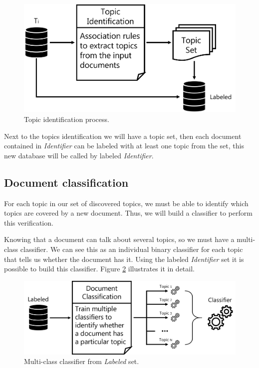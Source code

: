 \begin{figure}[h!]
	\centering
	\includegraphics[width=0.8\linewidth]{01.Chapters/04.Materials/topic-identification}
	\caption{Topic identification process.}
	\label{fig:topic-identification}
\end{figure}

Next to the topics identification we will have a topic set, then each document contained in \textit{Identifier} can be labeled with at least one topic from the set, this new database will be called by labeled \textit{Identifier}.

\subsection{Document classification}

For each topic in our set of discovered topics, we must be able to identify which topics are covered by a new document. Thus, we will build a classifier to perform this verification.

Knowing that a document can talk about several topics, so we must have a multi-class classifier. We can see this as an individual binary classifier for each topic that tells us whether the document has it. Using the labeled \textit{Identifier} set it is possible to build this classifier. Figure \ref{fig:document-classification} illustrates it in detail.

\begin{figure}[h!]
	\centering
	\includegraphics[width=0.9\linewidth]{01.Chapters/04.Materials/document-classification}
	\caption{Multi-class classifier from \textit{Labeled} set.}
	\label{fig:document-classification}
\end{figure}

